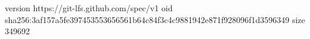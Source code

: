 version https://git-lfs.github.com/spec/v1
oid sha256:3af157a5fe397453553656561b64c84f3c4c9881942e871f928096f1d3596349
size 349692
